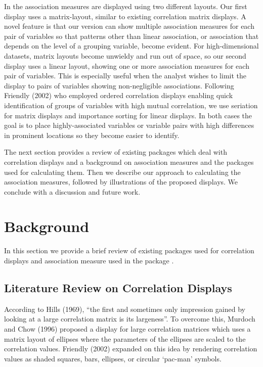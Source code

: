 In  the association measures are displayed using two different layouts. Our first display uses a matrix-layout, similar to existing correlation matrix displays. A novel feature is that our version can show multiple association measures for each pair of variables so that patterns other than linear association, or association that depends on the level of a grouping variable, become evident. For high-dimensional datasets, matrix layouts become unwieldy and run out of space, so our second display uses a linear layout, showing one or more association measures for each pair of variables. This is especially useful when the analyst wishes to limit the display to pairs of variables showing non-negligible associations.
Following Friendly (2002) who employed ordered correlation displays enabling quick identification of groups of variables with high mutual correlation, we use seriation for matrix displays and importance sorting for linear displays. In both cases the goal is to place highly-associated variables or variable pairs with high differences in prominent locations so they become easier to identify.

The next section provides a review of existing packages which deal with correlation displays and a background on association measures and the packages used for calculating them. Then we describe our approach to calculating the association measures, followed by illustrations of the proposed displays. We conclude with a discussion and future work.

\hypertarget{background}{%
\section{Background}\label{background}}

In this section we provide a brief review of existing packages used for correlation displays and association measure used in the package .

\hypertarget{literature-review-on-correlation-displays}{%
\subsection{Literature Review on Correlation Displays}\label{literature-review-on-correlation-displays}}

According to Hills (1969), ``the first and sometimes only impression gained by looking at a large correlation matrix is its largeness''. To overcome this, Murdoch and Chow (1996) proposed a display for large correlation matrices which uses a matrix layout of ellipses where the parameters of the ellipses are scaled to the correlation values. Friendly (2002) expanded on this idea by rendering correlation values as shaded squares, bars, ellipses, or circular `pac-man' symbols.

